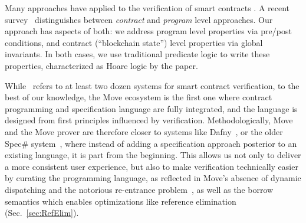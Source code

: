 
Many approaches have applied to the verification of smart contracts \cite{liu2019survey,miller2018smart,CONTRACT_VERIFICATION}.
A recent survey~\cite{CONTRACT_VERIFICATION} distinguishes between \emph{contract}
and \emph{program} level approaches. Our approach has aspects of both: we
address program level properties via pre/post conditions, and contract
(``blockchain state'') level properties via global invariants. In both cases, we
use traditional predicate logic to write these properties, characterized as
Hoare logic by the paper.

While~\cite{CONTRACT_VERIFICATION} refers to at least two dozen systems for
smart contract verification, to the best of our knowledge, the Move ecosystem is
the first one where contract programming and specification language are fully
integrated, and the language is designed from first principles influenced by
verification. Methodologically, Move and the Move prover are therefore closer to
systems like Dafny~\cite{DAFNY}, or the older Spec\# system~\cite{SPECSHARP},
where instead of adding a specification approach posterior to an existing
language, it is part from the beginning. This allows us not only to deliver a
more consistent user experience, but also to make verification technically
easier by curating the programming language, as reflected in Move's absence of
dynamic dispatching and the notorious re-entrance problem~\cite{REENTRANCE}, as
well as the borrow semantics which enables optimizations like reference
elimination (Sec.~\ref{sec:RefElim}).


